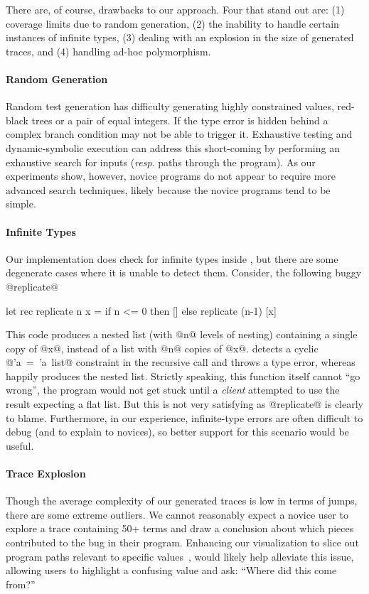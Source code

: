 There are, of course, drawbacks to our approach. Four that stand out
are: (1) coverage limits due to random generation, (2) the inability to
handle certain instances of infinite types, (3) dealing with an
explosion in the size of generated traces, and (4) handling ad-hoc
polymorphism.

\paragraph{Random Generation}
Random test generation has difficulty generating highly constrained
values, \eg red-black trees or a pair of equal integers. If the type
error is hidden behind a complex branch condition \nanomaly may not be
able to trigger it. Exhaustive testing and dynamic-symbolic execution
can address this short-coming by performing an exhaustive search for
inputs (\emph{resp}. paths through the program). As our experiments
show, however, novice programs do not appear to require more advanced
search techniques, likely because the novice programs tend to be simple.

\paragraph{Infinite Types}
Our implementation does check for infinite types inside \forcesym, but
there are some degenerate cases where it is unable to detect
them. Consider, the following buggy @replicate@
%
\begin{code}
  let rec replicate n x =
    if n <= 0 then []
              else replicate (n-1) [x]
\end{code}
%
This code produces a nested list (with @n@ levels of nesting) containing
a single copy of @x@, instead of a list with @n@ copies of @x@. \ocaml
detects a cyclic \hbox{@'a = 'a list@} constraint in the recursive call
and throws a type error, whereas \nanomaly happily %
produces the nested list.  Strictly speaking, this function itself cannot
``go wrong'', the program would not get stuck until a \emph{client}
attempted to use the result expecting a flat list. But this is not very
satisfying as @replicate@ is clearly to blame. Furthermore, in our
experience, infinite-type errors are often difficult to %
debug (and to explain to novices), so better support for this scenario
would be useful.

\paragraph{Trace Explosion}
Though the average complexity of our generated traces is low in terms of
jumps, there are some extreme outliers. We cannot reasonably expect a
novice user to explore a trace containing 50+ terms and draw a
conclusion about which pieces contributed to the bug in their
program. Enhancing our visualization to slice out program paths relevant
to specific values~\cite{Perera2012-dy},
would likely help alleviate this issue, allowing users to
highlight a confusing value and ask: ``Where did this come from?''

